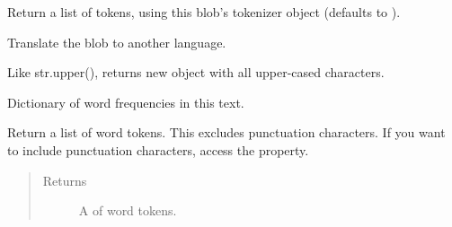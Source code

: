 \documentclass[letterpaper,10pt,english]{sphinxmanual}
\begin{document}
\begin{fulllineitems}
\begin{fulllineitems}
\begin{quote}
\begin{description}
\end{description}\end{quote}

\end{fulllineitems}


\begin{fulllineitems}
\label{api_reference:textblob_de.blob.BaseBlob.tokens}
Return a list of tokens, using this blob's tokenizer object
(defaults to ).

\end{fulllineitems}


\begin{fulllineitems}
\label{api_reference:textblob_de.blob.BaseBlob.translate}
Translate the blob to another language.

\end{fulllineitems}


\begin{fulllineitems}
\label{api_reference:textblob_de.blob.BaseBlob.upper}
Like str.upper(), returns new object with all upper-cased characters.

\end{fulllineitems}


\begin{fulllineitems}
\label{api_reference:textblob_de.blob.BaseBlob.word_counts}
Dictionary of word frequencies in this text.

\end{fulllineitems}


\begin{fulllineitems}
\label{api_reference:textblob_de.blob.BaseBlob.words}
Return a list of word tokens. This excludes punctuation characters.
If you want to include punctuation characters, access the 
property.
\begin{quote}\begin{description}
\item[{Returns}] \leavevmode
A {\hyperref[api_reference:textblob_de.blob.WordList]{}} of word tokens.

\end{description}\end{quote}

\end{fulllineitems}


\end{fulllineitems}
\end{document}
